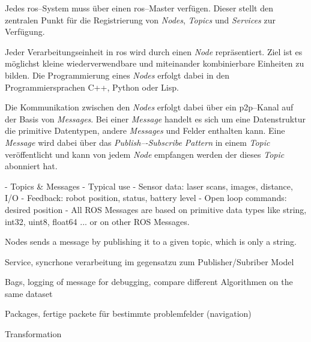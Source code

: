 Jedes \Gls{ros}--System muss über einen \Gls{ros}--Master verfügen. Dieser stellt den zentralen Punkt für die Registrierung von \textit{Nodes}, \textit{Topics} und \textit{Services} zur Verfügung.

Jeder Verarbeitungseinheit in \Gls{ros} wird durch einen \textit{Node} repräsentiert. Ziel ist es möglichst kleine wiederverwendbare und miteinander kombinierbare Einheiten zu bilden. Die Programmierung eines \textit{Nodes} erfolgt dabei in den Programmiersprachen C++, Python oder Lisp.

Die Kommunikation zwischen den \textit{Nodes} erfolgt dabei über ein \Gls{p2p}--Kanal auf der Basis von \textit{Messages}. Bei einer \textit{Message} handelt es sich um eine Datenstruktur die primitive Datentypen, andere \textit{Messages} und Felder enthalten kann. Eine \textit{Message} wird dabei über das \textit{Publish–-Subscribe Pattern} in einem \textit{Topic} veröffentlicht und kann von jedem \textit{Node} empfangen werden der dieses \textit{Topic} abonniert hat.




		- Topics \& Messages
			- Typical use
				- Sensor data: laser scans, images, distance, I/O
				- Feedback: robot position, status, battery level
				- Open loop commands: desired position
			- All ROS Messages are based on primitive data types like string, int32, uint8, float64 ... or on other ROS Messages.



Nodes sends a message by publishing it to a given topic, which is only a string.

Service, syncrhone verarbeitung im gegensatzu zum Publisher/Subriber Model

Bags, logging of message for debugging, compare different Algorithmen on the same dataset

Packages, fertige packete für bestimmte problemfelder (navigation)

Transformation

